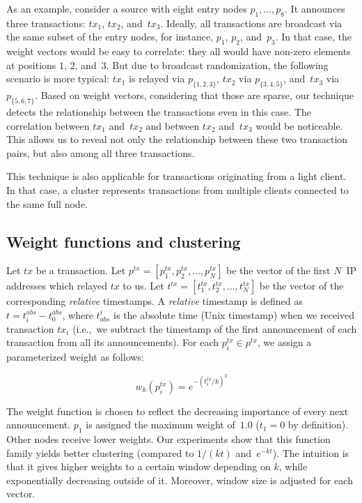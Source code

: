 As an example, consider a source with eight entry nodes $p_1, \dots, p_8$.
It announces three transactions: $tx_1$, $tx_2$, and~$tx_3$.
Ideally, all transactions are broadcast via the same subset of the entry nodes, for instance, $p_1$, $p_2$, and~$p_3$.
In that case, the weight vectors would be easy to correlate: they all would have non-zero elements at positions $1$, $2$, and~$3$.
But due to broadcast randomization, the following scenario is more typical: $tx_1$ is relayed via $p_{\{1,2,3\}}$, $tx_2$ via $p_{\{3,4,5\}}$, and~$tx_3$ via $p_{\{5,6,7\}}$.
Based on weight vectors, considering that those are sparse, our technique detects the relationship between the transactions even in this case.
The correlation between $tx_1$ and~$tx_2$ and between $tx_2$ and~$tx_3$ would be noticeable.
This allows us to reveal not only the relationship between these two transaction pairs, but also among all three transactions.

This technique is also applicable for transactions originating from a light client.
In that case, a cluster represents transactions from multiple clients connected to the same full node.


\subsection{Weight functions and clustering}

Let $tx$ be a transaction.
Let $p^{tx} = [p^{tx}_1, p^{tx}_2, \dots, p^{tx}_N]$ be the vector of the first $N$~IP addresses which relayed $tx$ to us.
Let $t^{tx} = [t^{tx}_1, t^{tx}_2, \dots, t^{tx}_N]$ be the vector of the corresponding \textit{relative} timestamps.
A \textit{relative} timestamp is defined as $t = t^{abs}_i - t^{abs}_0$, where $t_{abs}^i$ is the absolute time (Unix timestamp) when we received transaction $tx_i$ (i.e.,~we subtract the timestamp of the first announcement of each transaction from all its announcements).
For each $p^{tx}_i \in p^{tx}$, we assign a parameterized weight as follows:

\[
w_k(p^{tx}_i) = e^{-(t^{tx}_i/k)^2}
\]

The weight function is chosen to reflect the decreasing importance of every next announcement.
$p_1$ is assigned the maximum weight of~$1.0$ ($t_1=0$ by definition).
Other nodes receive lower weights.
Our experiments show that this function family yields better clustering (compared to $1/(kt)$ and~$e^{-kt}$).
The intuition is that it gives higher weights to a certain window depending on $k$, while exponentially decreasing outside of it.
Moreover, window size is adjusted for each vector.

